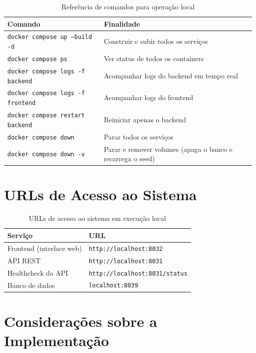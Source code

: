 \documentclass[12pt, a4paper]{article}
\newcommand{\thead}[1]{\cellcolor{tableheader}\color{white}\bfseries #1}
\newcommand{\talt}{\rowcolor{tablerowalt}}
\begin{document}
\begin{table}[H]
\centering
\begin{tabularx}{\textwidth}{|l|X|}
\hline
\thead{Comando} & \thead{Finalidade} \\
\hline
\texttt{docker compose up --build -d} & Construir e subir todos os serviços \\
\talt \texttt{docker compose ps} & Ver status de todos os containers \\
\texttt{docker compose logs -f backend} & Acompanhar logs do backend em tempo real \\
\talt \texttt{docker compose logs -f frontend} & Acompanhar logs do frontend \\
\texttt{docker compose restart backend} & Reiniciar apenas o backend \\
\talt \texttt{docker compose down} & Parar todos os serviços \\
\texttt{docker compose down -v} & Parar e remover volumes (apaga o banco e recarrega o seed) \\
\hline
\end{tabularx}
\caption{Referência de comandos para operação local}
\end{table}

\section{URLs de Acesso ao Sistema}

\begin{table}[H]
\centering
\begin{tabularx}{\textwidth}{|l|X|}
\hline
\thead{Serviço} & \thead{URL} \\
\hline
Frontend (interface web) & \texttt{http://localhost:8032} \\
\talt API REST             & \texttt{http://localhost:8031} \\
Healthcheck da API        & \texttt{http://localhost:8031/status} \\
\talt Banco de dados        & \texttt{localhost:8039} \\
\hline
\end{tabularx}
\caption{URLs de acesso ao sistema em execução local}
\end{table}


\section{Considerações sobre a Implementação}
\end{document}
